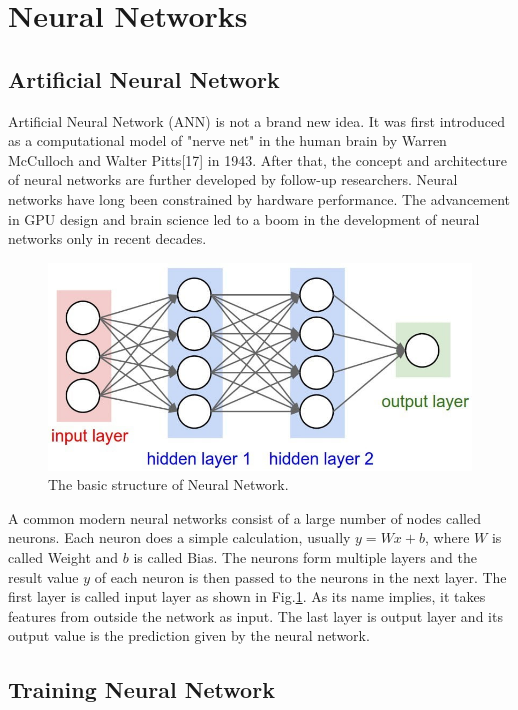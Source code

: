 \section{Neural Networks}

\subsection{Artificial Neural Network}

Artificial Neural Network (ANN) is not a brand new idea. It was first introduced as a computational model of "nerve net" in the human brain by Warren McCulloch and Walter Pitts[17] in 1943. After that, the concept and architecture of neural networks are further developed by follow-up researchers. Neural networks have long been constrained by hardware performance. The advancement in GPU design and brain science led to a boom in the development of neural networks only in recent decades. 

\begin{figure}[H]
  \includegraphics[width=\linewidth]{figures/ann.jpg}
  \caption{The basic structure of Neural Network.}
  \label{fig:ann}
\end{figure}

A common modern neural networks consist of a large number of nodes called neurons. Each neuron does a simple calculation, usually $y = Wx + b$, where $W$ is called Weight and $b$ is called Bias. The neurons form multiple layers and the result value $y$ of each neuron is then passed to the neurons in the next layer. The first layer is called input layer as shown in Fig.\ref{fig:ann}. As its name implies, it takes features from outside the network as input. The last layer is output layer and its output value is the prediction given by the neural network.

\subsection{Training Neural Network}

